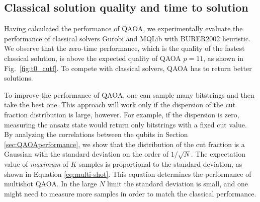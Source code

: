 \subsection{Classical solution quality and time to solution}
Having calculated the performance of QAOA, we experimentally evaluate the performance of classical solvers Gurobi and MQLib with BURER2002 heuristic. We observe that the zero-time performance, which is the quality of the fastest classical solution, is above the expected quality of QAOA $p=11$, as shown in Fig.~\ref{fig:t0_cutf}. To compete with classical solvers, QAOA has to return better solutions.

To improve the performance of QAOA, one can sample many bitstrings and then take the best one. This approach will  work only  if the  dispersion of the cut fraction distribution is large, however. For example, if the  dispersion is zero, measuring the ansatz state would return only bitstrings with a fixed cut value. By analyzing the correlations between the qubits in Section \ref{sec:QAOAperformance}, we show that the distribution of the cut fraction is a Gaussian with the  standard deviation on the order of $1/\sqrt N$. The expectation value of \emph{maximum} of $K$ samples is proportional to the  standard deviation, as shown in Equation \ref{eq:multi-shot}. This equation determines the performance of multishot QAOA. In the large $N$ limit the  standard deviation is small, and one might need to measure more samples in order to match the classical performance.

